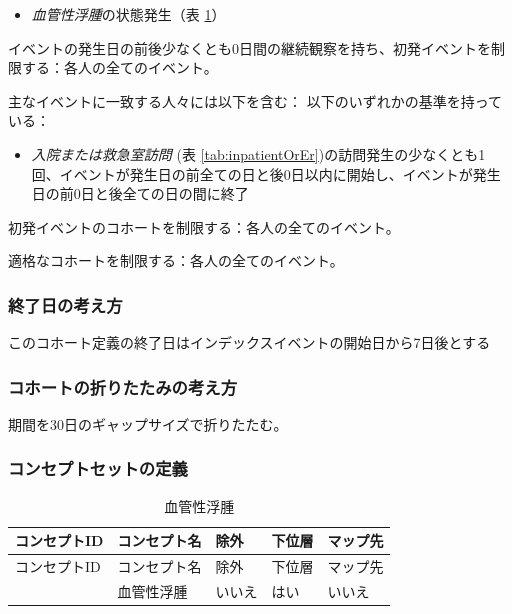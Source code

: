 \documentclass[
  11pt]{book}
\providecommand{\tightlist}{%
  \setlength{\itemsep}{0pt}\setlength{\parskip}{0pt}}
\theoremstyle{definition}
\theoremstyle{definition}
\theoremstyle{definition}
\theoremstyle{definition}
\theoremstyle{remark}
\begin{document}
\begin{itemize}
\tightlist
\item
  \emph{血管性浮腫}の状態発生（表 \ref{tab:angioedema}）
\end{itemize}

イベントの発生日の前後少なくとも0日間の継続観察を持ち、初発イベントを制限する：各人の全てのイベント。

主なイベントに一致する人々には以下を含む：
以下のいずれかの基準を持っている：

\begin{itemize}
\tightlist
\item
  \emph{入院または救急室訪問} (表 \ref{tab:inpatientOrEr})の訪問発生の少なくとも1回、イベントが発生日の前全ての日と後0日以内に開始し、イベントが発生日の前0日と後全ての日の間に終了
\end{itemize}

初発イベントのコホートを制限する：各人の全てのイベント。

適格なコホートを制限する：各人の全てのイベント。

\subsubsection*{終了日の考え方}\label{ux7d42ux4e86ux65e5ux306eux8003ux3048ux65b9-1}

このコホート定義の終了日はインデックスイベントの開始日から7日後とする

\subsubsection*{コホートの折りたたみの考え方}\label{ux30b3ux30dbux30fcux30c8ux306eux6298ux308aux305fux305fux307fux306eux8003ux3048ux65b9}

期間を30日のギャップサイズで折りたたむ。

\subsubsection*{コンセプトセットの定義}\label{ux30b3ux30f3ux30bbux30d7ux30c8ux30bbux30c3ux30c8ux306eux5b9aux7fa9-1}

\begin{longtable}[]{@{}lllll@{}}
\caption{\label{tab:angioedema} 血管性浮腫}\tabularnewline
\toprule\noalign{}
コンセプトID & コンセプト名 & 除外 & 下位層 & マップ先 \\
\midrule\noalign{}
\endfirsthead
\toprule\noalign{}
コンセプトID & コンセプト名 & 除外 & 下位層 & マップ先 \\
\midrule\noalign{}
\endhead
\bottomrule\noalign{}
\endlastfoot
432791 & 血管性浮腫 & いいえ & はい & いいえ \\
\end{longtable}
\end{document}
